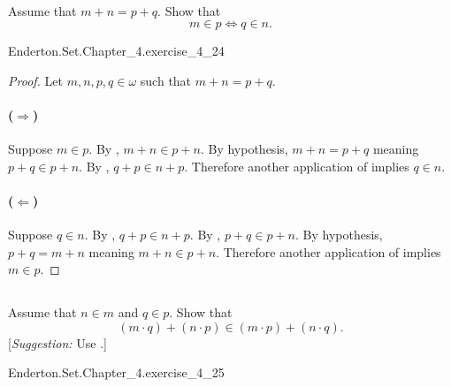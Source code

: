 \documentclass{report}
\begin{document}
\subsection{}%

  Assume that $m + n = p + q$.
  Show that $$m \in p \iff q \in n.$$

    {Enderton.Set.Chapter\_4.exercise\_4\_24}

  \begin{proof}

    Let $m, n, p, q \in \omega$ such that $m + n = p + q$.

    \paragraph{($\Rightarrow$)}%

      Suppose $m \in p$.
      By , $m + n \in p + n$.
      By hypothesis, $m + n = p + q$ meaning $p + q \in p + n$.
      By , $q + p \in n + p$.
      Therefore another application of  implies
        $q \in n$.

    \paragraph{($\Leftarrow$)}%

      Suppose $q \in n$.
      By , $q + p \in n + p$.
      By , $p + q \in p + n$.
      By hypothesis, $p + q = m + n$ meaning $m + n \in p + n$.
      Therefore another application of  implies
        $m \in p$.

  \end{proof}

\subsection{}%

  Assume that $n \in m$ and $q \in p$.
  Show that $$(m \cdot q) + (n \cdot p) \in (m \cdot p) + (n \cdot q).$$
  [\textit{Suggestion:} Use .]

    {Enderton.Set.Chapter\_4.exercise\_4\_25}
\end{document}
